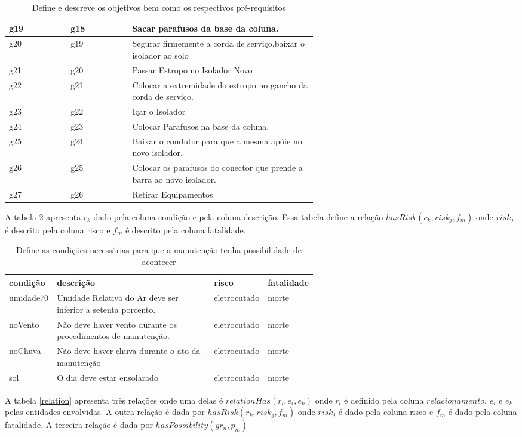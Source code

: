 \documentclass[12pt]{article}
\begin{document}
\begin{table}[H]
\begin{tabular}{|l|l|p{0.6\linewidth}|}
g19 &  g18 & Sacar parafusos da base da coluna. \\ \hline
g20 &  g19 & Segurar firmemente a corda de serviço,baixar o isolador ao solo \\ \hline
g21 &  g20 & Passar Estropo no Isolador Novo \\ \hline
g22 &  g21 & Colocar a extremidade do estropo no gancho da corda de serviço. \\ \hline
g23 &  g22 & Içar o Isolador \\ \hline
g24 &  g23 & Colocar Parafusos na base da coluna. \\ \hline
g25 &  g24 & Baixar o condutor para que a mesma apóie no novo isolador. \\ \hline
g26 &  g25 & Colocar os parafusos do conector que prende a barra ao novo isolador. \\ \hline
g27 &  g26 & Retirar Equipamentos \\ \hline
\end{tabular}
\caption{Define e descreve os objetivos bem como os respectivos pré-requisitos}
\label{g}
\end{table}

A tabela \ref{condition} apresenta $c_k$ dado pela coluna condição e pela coluna descrição. Essa tabela define a relação $hasRisk(c_k,risk_j,f_m)$ onde $risk_j$ é descrito pela coluna risco e $f_m$ é descrito pela coluna fatalidade. 

\begin{table}[H]
\centering
\begin{tabular}{|l|p{0.6\linewidth}|l|l|}
\hline
\textbf{condição} & \textbf{descrição} & \textbf{risco} & \textbf{fatalidade} \\ \hline
umidade70 & Umidade Relativa do Ar deve ser inferior a setenta porcento. & eletrocutado & morte \\ \hline
noVento & Não deve haver vento durante os procedimentos de manutenção. & eletrocutado & morte \\ \hline
noChuva & Não deve haver chuva durante o ato da manutenção & eletrocutado & morte \\ \hline
sol & O dia deve estar ensolarado & eletrocutado & morte \\ \hline
\end{tabular}
\caption{Define as condições necessárias para que a manutenção tenha possibilidade de acontecer}
\label{condition}
\end{table}


A tabela \ref{relation} apresenta três relações onde uma delas é $relationHas(r_l,e_i,e_k)$ onde $r_l$ é definido pela coluna $relacionamento$, $e_i$ e $e_k$ pelas entidades envolvidas. A outra relação é dada por $hasRisk(r_k,risk_j,f_m)$ onde $risk_j$ é dado pela coluna risco e $f_m$ é dado pela coluna fatalidade. A terceira relação é dada por $hasPossibility(gr_n,p_m)$ 
\end{document}
